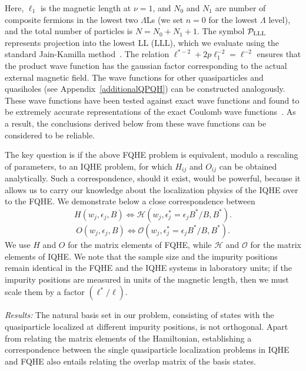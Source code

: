 \documentclass[twocolumn,floatfix,prb,aps,showpacs]{revtex4-2}
\newcommand{\be}{\begin{equation}}
\newcommand{\ee}{\end{equation}}
\newcommand{\IO}{\mathcal{O}}
\newcommand{\IH}{\mathcal{H}}
\begin{document}
Here, $\ell_1$ is the magnetic length at $\nu=1$, and $N_0$ and $N_1$ are number of composite fermions in the lowest two $\Lambda$Ls (we set $n=0$ for the lowest $\Lambda$ level), and the total number of particles is $N=N_0+N_1+1$. The symbol ${\cal P}_{\rm LLL}$ represents projection into the lowest LL (LLL), which we evaluate using the standard Jain-Kamilla method~\cite{Jain97,Jain97b}. 
The relation 
$\ell^{*-2}+2p\ell_1^{-2}=\ell^{-2}$
ensures that the product wave function has the gaussian factor corresponding to the actual external magnetic field. 
The wave functions for other quasiparticles and quasiholes (see Appendix~\ref{additionalQPQH}) can be constructed analogously. These wave functions have been tested against exact wave functions and found to be extremely accurate representations of the exact Coulomb wave functions~\cite{Jain07}. As a result, the conclusions derived below from these wave functions can be considered to be reliable. 

The key question is if the above FQHE problem is equivalent, modulo a rescaling of parameters, to an IQHE problem, for which $H_{ij}$ and $O_{ij}$ can be obtained analytically. Such a correspondence, should it exist, would be powerful, because it allows us to carry our knowledge about the localization physics of the IQHE over to the FQHE.  We demonstrate below a close correspondence between 
\be
H(w_j,\epsilon_j,B) \iff \IH(w_j,\epsilon^*_j=\epsilon_j B^*/B,B^*).
\ee
\be
O(w_j,\epsilon_j,B) \iff \IO(w_j,\epsilon^*_j=\epsilon_j B^*/B,B^*).
\ee
We use $H$ and $O$ for the matrix elements of FQHE, while $\IH$ and $\IO$ for the matrix elements of IQHE. We note that the sample size and the impurity positions remain identical in the FQHE and the IQHE systems in laboratory units; if the impurity positions are measured in units of the magnetic length, then we must scale them by a factor $(\ell^*/\ell)$.


{\it Results:} 
The natural basis set in our problem, consisting of states with the quasiparticle localized at different impurity positions, is not orthogonal. Apart from relating the matrix elements of the Hamiltonian, establishing a correspondence between the single quasiparticle localization problems in IQHE and FQHE also entails relating the overlap matrix of the basis states.
\end{document}
